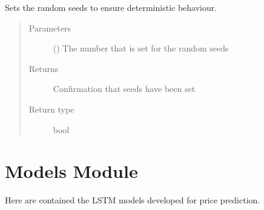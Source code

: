 \documentclass[letterpaper,10pt,english]{sphinxmanual}
\begin{document}

\begin{fulllineitems}
\label{\detokenize{deeplearning:Foresight.deeplearning.set_seed}}
Sets the random seeds to ensure deterministic behaviour.
\begin{quote}\begin{description}
\item[{Parameters}] \leavevmode
{} () \textendash{} The number that is set for the random seeds

\item[{Returns}] \leavevmode
Confirmation that seeds have been set

\item[{Return type}] \leavevmode
bool

\end{description}\end{quote}

\end{fulllineitems}



\section{Models Module}
\label{\detokenize{models:models-module}}\label{\detokenize{models::doc}}
Here are contained the LSTM models developed for price prediction.
\end{document}
